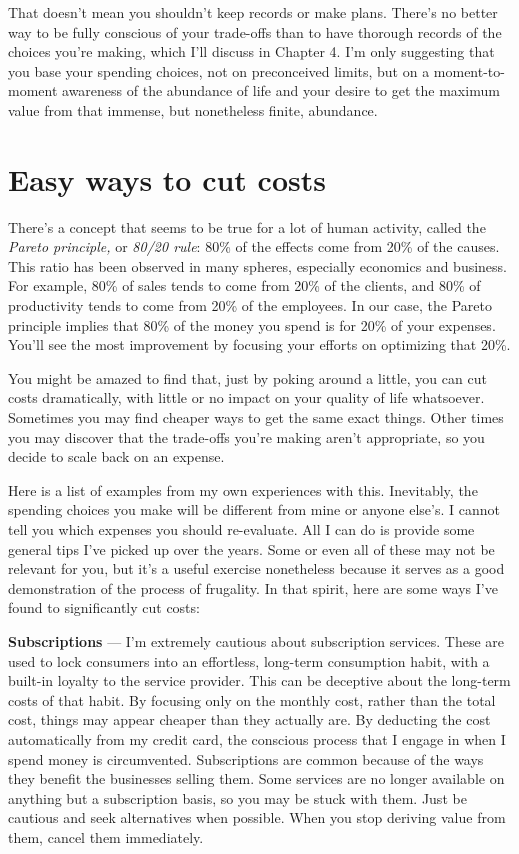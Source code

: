That doesn't mean you shouldn't keep records or make plans. There's no better way to be fully conscious of your trade-offs than to have thorough records of the choices you're making, which I'll discuss in Chapter 4. I'm only suggesting that you base your spending choices, not on preconceived limits, but on a moment-to-moment awareness of the abundance of life and your desire to get the maximum value from that immense, but nonetheless finite, abundance.

\section{Easy ways to cut costs}
There's a concept that seems to be true for a lot of human activity, called the \emph{Pareto principle,} or \emph{80/20 rule}: 80\% of the effects come from 20\% of the causes. This ratio has been observed in many spheres, especially economics and business. For example, 80\% of sales tends to come from 20\% of the clients, and 80\% of productivity tends to come from 20\% of the employees. In our case, the Pareto principle implies that 80\% of the money you spend is for 20\% of your expenses. You'll see the most improvement by focusing your efforts on optimizing that 20\%.

You might be amazed to find that, just by poking around a little, you can cut costs dramatically, with little or no impact on your quality of life whatsoever. Sometimes you may find cheaper ways to get the same exact things. Other times you may discover that the trade-offs you're making aren't appropriate, so you decide to scale back on an expense.

Here is a list of examples from my own experiences with this. Inevitably, the spending choices you make will be different from mine or anyone else's. I cannot tell you which expenses you should re-evaluate. All I can do is provide some general tips I've picked up over the years. Some or even all of these may not be relevant for you, but it's a useful exercise nonetheless because it serves as a good demonstration of the process of frugality. In that spirit, here are some ways I've found to significantly cut costs:

\textbf{Subscriptions} --- I'm extremely cautious about subscription services. These are used to lock consumers into an effortless, long-term consumption habit, with a built-in loyalty to the service provider. This can be deceptive about the long-term costs of that habit. By focusing only on the monthly cost, rather than the total cost, things may appear cheaper than they actually are. By deducting the cost automatically from my credit card, the conscious process that I engage in when I spend money is circumvented. Subscriptions are common because of the ways they benefit the businesses selling them. Some services are no longer available on anything but a subscription basis, so you may be stuck with them. Just be cautious and seek alternatives when possible. When you stop deriving value from them, cancel them immediately.

